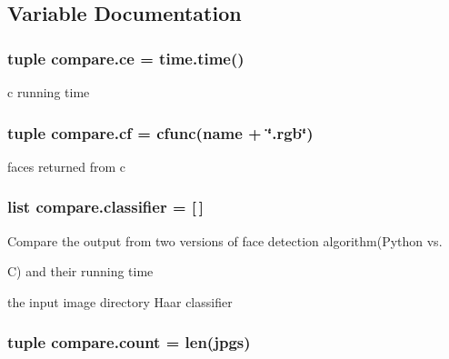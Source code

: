 \subsection{Variable Documentation}
\hypertarget{namespacecompare_a7387240bcc549d8e8a3dc6ad7ad9e51e}{}
\subsubsection[{ce}]{\setlength{\rightskip}{0pt plus 5cm}tuple compare.\+ce = time.\+time()}\label{namespacecompare_a7387240bcc549d8e8a3dc6ad7ad9e51e}


c running time 

\hypertarget{namespacecompare_a51fb2e77be48389395beafd6d6756fa9}{}
\subsubsection[{cf}]{\setlength{\rightskip}{0pt plus 5cm}tuple compare.\+cf = {\bf cfunc}({\bf name} + \char`\"{}.rgb\char`\"{})}\label{namespacecompare_a51fb2e77be48389395beafd6d6756fa9}


faces returned from c 

\hypertarget{namespacecompare_a2e7fcdc543e6a0fde614081764c7b5f8}{}
\subsubsection[{classifier}]{\setlength{\rightskip}{0pt plus 5cm}list compare.\+classifier = \mbox{[}$\,$\mbox{]}}\label{namespacecompare_a2e7fcdc543e6a0fde614081764c7b5f8}


Compare the output from two versions of face detection algorithm(Python vs. 

C) and their running time \begin{DoxyItemize}
\item the input image directory Haar classifier \end{DoxyItemize}
\hypertarget{namespacecompare_aa6ed51fdf2d385739579bec3f610e8e7}{}
\subsubsection[{count}]{\setlength{\rightskip}{0pt plus 5cm}tuple compare.\+count = len({\bf jpgs})}\label{namespacecompare_aa6ed51fdf2d385739579bec3f610e8e7}


